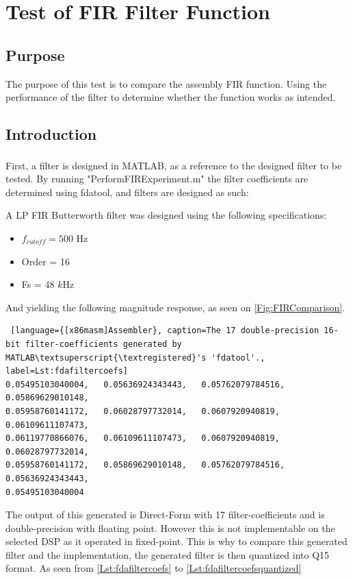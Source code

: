 \section{Test of FIR Filter Function}

\subsection{Purpose}
The purpose of this test is to compare the assembly FIR function. Using the performance of the filter to determine whether the function works as intended.

\subsection{Introduction}
First, a filter is designed in MATLAB\textsuperscript{\textregistered}, as a reference to the designed filter to be tested. By running "PerformFIRExperiment.m" the filter coefficients are determined using fdatool, and filters are designed as such:

A LP FIR Butterworth filter was designed using the following specifications:

\begin{itemize}
	\item $f_{cutoff} = 500$ Hz
	\item Order = 16
	\item Fs = 48 $k$Hz
\end{itemize}


And yielding the following magnitude response, as seen on \autoref{Fig:FIRComparison}.

\begin{lstlisting} [language={[x86masm]Assembler}, caption=The 17 double-precision 16-bit filter-coefficients generated by MATLAB\textsuperscript{\textregistered}'s 'fdatool'., label=Lst:fdafiltercoefs]
0.05495103040004,	0.05636924343443,	0.05762079784516,	0.05869629010148,
0.05958760141172,	0.06028797732014,	0.0607920940819,	0.06109611107473,
0.06119770866076,	0.06109611107473,	0.0607920940819,	0.06028797732014,
0.05958760141172,	0.05869629010148,	0.05762079784516,	0.05636924343443,
0.05495103040004
\end{lstlisting}


The output of this generated is Direct-Form with 17 filter-coefficients and is double-precision with floating point. However this is not implementable on the selected DSP as it operated in fixed-point. This is why to compare this generated filter and the implementation, the generated filter is then quantized into Q15 format. As seen from \autoref{Lst:fdafiltercoefs} to \autoref{Lst:fdafiltercoefsquantized}

